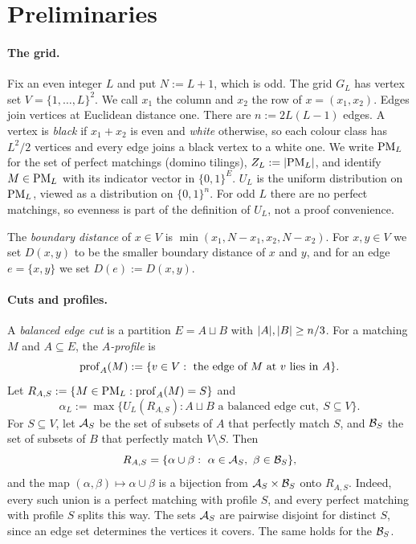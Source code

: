\section{Preliminaries}\label{sec:prelim}

\paragraph{The grid.} Fix an even integer $L$ and put $N:=L+1$, which is odd. The grid $G_L$ has vertex set $V=\{1,\dots,L\}^2$. We call $x_1$ the column and $x_2$ the row of $x=(x_1,x_2)$. Edges join vertices at Euclidean distance one. There are $n:=2L(L-1)$ edges. A vertex is \emph{black} if $x_1+x_2$ is even and \emph{white} otherwise, so each colour class has $L^2/2$ vertices and every edge joins a black vertex to a white one. We write $\mathrm{PM}_L$ for the set of perfect matchings (domino tilings), $Z_L:=\lvert \mathrm{PM}_L\rvert$, and identify $M\in\mathrm{PM}_L$ with its indicator vector in $\{0,1\}^E$. $U_L$ is the uniform distribution on $\mathrm{PM}_L$, viewed as a distribution on $\{0,1\}^n$. For odd $L$ there are no perfect matchings, so evenness is part of the definition of $U_L$, not a proof convenience.

The \emph{boundary distance} of $x\in V$ is $\min(x_1,N-x_1,x_2,N-x_2)$. For $x,y\in V$ we set $D(x,y)$ to be the smaller boundary distance of $x$ and $y$, and for an edge $e=\{x,y\}$ we set $D(e):=D(x,y)$.

\paragraph{Cuts and profiles.} A \emph{balanced edge cut} is a partition $E=A\sqcup B$ with $\lvert A\rvert,\lvert B\rvert\ge n/3$. For a matching $M$ and $A\subseteq E$, the \emph{$A$-profile} is
\[
  \operatorname{prof}_A(M):=\{v\in V:\ \text{the edge of $M$ at $v$ lies in $A$}\}.
\]
Let $R_{A,S}:=\{M\in\mathrm{PM}_L:\operatorname{prof}_A(M)=S\}$ and
\[
  \alpha_L:=\max\bigl\{U_L(R_{A,S}) : A\sqcup B \text{ a balanced edge cut},\ S\subseteq V\bigr\}.
\]
For $S\subseteq V$, let $\mathcal{A}_S$ be the set of subsets of $A$ that perfectly match $S$, and $\mathcal{B}_S$ the set of subsets of $B$ that perfectly match $V\setminus S$. Then
\begin{equation}\label{eq:rectangle}
  R_{A,S}=\{\alpha\cup\beta:\ \alpha\in\mathcal{A}_S,\ \beta\in\mathcal{B}_S\},
\end{equation}
and the map $(\alpha,\beta)\mapsto\alpha\cup\beta$ is a bijection from $\mathcal{A}_S\times\mathcal{B}_S$ onto $R_{A,S}$. Indeed, every such union is a perfect matching with profile $S$, and every perfect matching with profile $S$ splits this way. The sets $\mathcal{A}_S$ are pairwise disjoint for distinct $S$, since an edge set determines the vertices it covers. The same holds for the $\mathcal{B}_S$.

